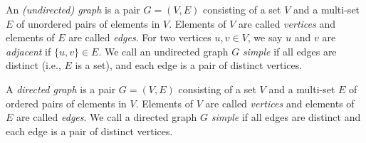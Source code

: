%
\begin{definition}
  An \textit{(undirected) graph} is a pair $G = (V,E)$ consisting of a set $V$ 
  and a multi-set $E$ of unordered pairs of elements in $V$. 
  Elements of $V$ are called \textit{vertices} and elements of $E$ are called \textit{edges}.
  For two vertices $u,v \in V$, we say $u$ and $v$ are \textit{adjacent} if $\{u,v\} \in E$.
  We call an undirected graph $G$ \textit{simple} if all edges are distinct (i.e., $E$ is a set), 
  and each edge is a pair of distinct vertices.
\end{definition}

\begin{definition}
  A \textit{directed graph} is a pair $G = (V,E)$ consisting of a set $V$ 
  and a multi-set $E$ of ordered pairs of elements in $V$. 
  Elements of $V$ are called \textit{vertices} and elements of $E$ are called \textit{edges}.
  We call a directed graph $G$ \textit{simple} if all edges are distinct and
  each edge is a pair of distinct vertices.
\end{definition}
